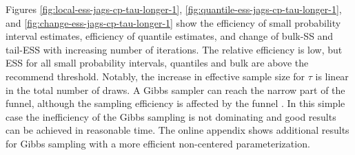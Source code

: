 \documentclass[american,]{article}
\theoremstyle{definition}
\begin{document}
Figures \ref{fig:local-ess-jags-cp-tau-longer-1},
\ref{fig:quantile-ess-jags-cp-tau-longer-1}, and
\ref{fig:change-ess-jags-cp-tau-longer-1} show the efficiency of small
probability interval estimates, efficiency of quantile estimates, and
change of bulk-SS and tail-ESS with increasing number of
iterations. The relative efficiency is low, but ESS for all small
probability intervals, quantiles and bulk are above the recommend
threshold. Notably, the increase in effective sample size for
$\tau$ is linear in the total number of draws.  A Gibbs sampler can
reach the narrow part of the funnel, although the sampling efficiency
is affected by the funnel \citep{Gelman+Huang+vanDyk+Boscardin:2008}.
In this simple case the inefficiency of the
Gibbs sampling is not dominating and good results can be achieved in
reasonable time. The online appendix shows additional results for Gibbs
sampling with a more efficient non-centered parameterization.
\end{document}
